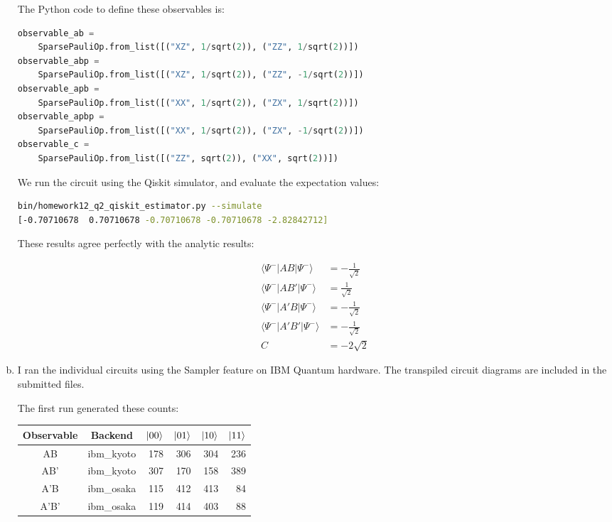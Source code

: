 \documentclass[12pt]{extarticle}
\begin{document}
\begin{enumerate}[(a)]
The Python code to define these observables is:
\begin{small}
\begin{lstlisting}[language=python]
observable_ab =
    SparsePauliOp.from_list([("XZ", 1/sqrt(2)), ("ZZ", 1/sqrt(2))])
observable_abp =
    SparsePauliOp.from_list([("XZ", 1/sqrt(2)), ("ZZ", -1/sqrt(2))])
observable_apb =
    SparsePauliOp.from_list([("XX", 1/sqrt(2)), ("ZX", 1/sqrt(2))])
observable_apbp =
    SparsePauliOp.from_list([("XX", 1/sqrt(2)), ("ZX", -1/sqrt(2))])
observable_c =
    SparsePauliOp.from_list([("ZZ", sqrt(2)), ("XX", sqrt(2))])
\end{lstlisting}
\end{small}

We run the circuit using the Qiskit simulator, and evaluate the expectation values:

\begin{lstlisting}[language=bash]
bin/homework12_q2_qiskit_estimator.py --simulate
[-0.70710678  0.70710678 -0.70710678 -0.70710678 -2.82842712]
\end{lstlisting}

These results agree perfectly with the analytic results:

\begin{align*}
\langle \Psi^{-}|AB|\Psi^{-}\rangle & = -\frac{1}{\sqrt{2}} \\
\langle \Psi^{-}|AB'|\Psi^{-}\rangle & = \frac{1}{\sqrt{2}} \\
\langle \Psi^{-}|A'B|\Psi^{-}\rangle & = -\frac{1}{\sqrt{2}} \\
\langle \Psi^{-}|A'B'|\Psi^{-}\rangle & = -\frac{1}{\sqrt{2}} \\
C & = -2\sqrt{2}
\end{align*}

\item

I ran the individual circuits using the Sampler feature on IBM Quantum hardware.
The transpiled circuit diagrams are included in the submitted files.

The first run generated these counts:

\begin{center}
\begin{tabular}{|c|c|r|r|r|r|}
\hline
Observable & Backend & $\ket{00}$ & $\ket{01}$ & $\ket{10}$ & $\ket{11}$  \\
\hline
AB   & ibm\_kyoto & 178 & 306 & 304 & 236 \\
AB'  & ibm\_kyoto & 307 & 170 & 158 & 389 \\
A'B  & ibm\_osaka & 115 & 412 & 413 &  84 \\
A'B' & ibm\_osaka & 119 & 414 & 403 &  88 \\
\hline
\end{tabular}
\end{center}


\end{enumerate}
\end{document}

